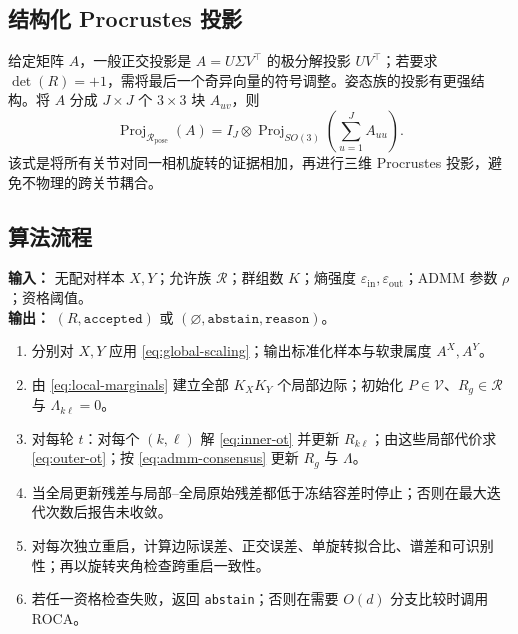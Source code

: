\documentclass[10pt,a4paper,fontset=windows]{ctexart}
\newcommand{\Proj}{\operatorname{Proj}}
\theoremstyle{definition}
\theoremstyle{remark}
\begin{document}
\subsection{结构化 Procrustes 投影}
给定矩阵 $A$，一般正交投影是 $A=U\Sigma V^\top$ 的极分解投影 $UV^\top$；若要求 $\det(R)=+1$，需将最后一个奇异向量的符号调整\cite{umeyama1991least}。姿态族的投影有更强结构。将 $A$ 分成 $J\times J$ 个 $3\times3$ 块 $A_{uv}$，则
\begin{equation}
\Proj_{\mathcal R_{\mathrm{pose}}}(A)
=I_J\otimes\Proj_{SO(3)}
\left(\sum_{u=1}^{J}A_{uu}\right).
\label{eq:block-projection}
\end{equation}
该式是将所有关节对同一相机旋转的证据相加，再进行三维 Procrustes 投影，避免不物理的跨关节耦合。

\subsection{算法流程}
\begin{algorithm}[t]
\caption{GC-HiWA 的冻结主干}
\textbf{输入：} 无配对样本 $X,Y$；允许族 $\mathcal R$；群组数 $K$；熵强度 $\varepsilon_{\mathrm{in}},\varepsilon_{\mathrm{out}}$；ADMM 参数 $\rho$；资格阈值。\\
\textbf{输出：} $(R,\texttt{accepted})$ 或 $(\varnothing,\texttt{abstain},\texttt{reason})$。
\begin{enumerate}
  \item 分别对 $X,Y$ 应用 \cref{eq:global-scaling}；输出标准化样本与软隶属度 $A^X,A^Y$。
  \item 由 \cref{eq:local-marginals} 建立全部 $K_XK_Y$ 个局部边际；初始化 $P\in\mathcal V$、$R_g\in\mathcal R$ 与 $\Lambda_{k\ell}=0$。
  \item 对每轮 $t$：对每个 $(k,\ell)$ 解 \cref{eq:inner-ot} 并更新 $R_{k\ell}$；由这些局部代价求 \cref{eq:outer-ot}；按 \cref{eq:admm-consensus} 更新 $R_g$ 与 $\Lambda$。
  \item 当全局更新残差与局部--全局原始残差都低于冻结容差时停止；否则在最大迭代次数后报告未收敛。
  \item 对每次独立重启，计算边际误差、正交误差、单旋转拟合比、谱差和可识别性；再以旋转夹角检查跨重启一致性。
  \item 若任一资格检查失败，返回 \texttt{abstain}；否则在需要 $O(d)$ 分支比较时调用 ROCA。
\end{enumerate}
\end{algorithm}
\end{document}
